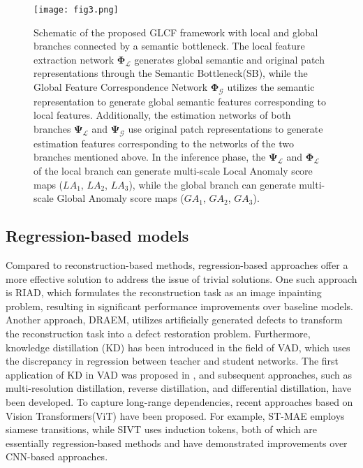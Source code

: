 \documentclass[lettersize,journal]{IEEEtran}
\begin{document}
\begin{figure*}[t]
\centerline{\texttt{[image: fig3.png]}}
\caption[width=\textwidth]{
Schematic of the proposed GLCF framework with local and global branches connected by a semantic bottleneck. The local feature extraction network $\mathbf{\Phi_{\mathcal{L}}}$ generates global semantic and original patch representations through the Semantic Bottleneck(SB), while the Global Feature Correspondence Network $\mathbf{\Phi_{\mathcal{G}}}$ utilizes the semantic representation to generate global semantic features corresponding to local features. Additionally, the estimation networks of both branches $\mathbf{\Psi_{\mathcal{L}}}$ and $\mathbf{\Psi_{\mathcal{G}}}$ use original patch representations to generate estimation features corresponding to the networks of the two branches mentioned above. In the inference phase, the $\mathbf{\Psi_{\mathcal{L}}}$ and  $\mathbf{\Phi_{\mathcal{L}}}$ of the local branch can generate multi-scale Local Anomaly score maps ($LA_{1}$, $LA_{2}$, $LA_{3}$), while the global branch can generate multi-scale Global Anomaly score maps ($GA_{1}$, $GA_{2}$, $GA_{3}$).
}
\label{fig1}
\end{figure*}

\subsection{Regression-based models}

Compared to reconstruction-based methods, regression-based approaches offer a more effective solution to address the issue of trivial solutions. One such approach is RIAD\cite{r11}, which formulates the reconstruction task as an image inpainting problem, resulting in significant performance improvements over baseline models. Another approach, DRAEM\cite{r20}, utilizes artificially generated defects to transform the reconstruction task into a defect restoration problem.
Furthermore, knowledge distillation (KD) has been introduced in the field of VAD, which uses the discrepancy in regression between teacher and student networks. The first application of KD in VAD was proposed in \cite{r12}, and subsequent approaches, such as multi-resolution distillation\cite{r13}, reverse distillation\cite{r14}, and differential distillation\cite{r15}, have been developed. To capture long-range dependencies, recent approaches based on Vision Transformers(ViT) have been proposed. For example, ST-MAE\cite{r16} employs siamese transitions, while SIVT\cite{r17} uses induction tokens, both of which are essentially regression-based methods and have demonstrated improvements over CNN-based approaches.
\end{document}
